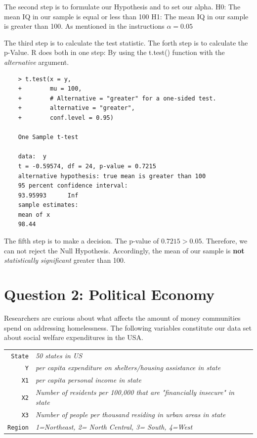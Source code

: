 \documentclass[12pt,letterpaper]{article}
\begin{document}
The second step is to formulate our Hypothesis and to set our alpha.
H0: The mean IQ in our sample is equal or less than 100
H1: The mean IQ in our sample is greater than 100. 
As mentioned in the instructions $\alpha = 0.05$


\newpage

The third step is to calculate the test statistic.
The forth step is to calculate the p-Value. R does both in one step: 
By using the t.test() function with the \textit{alternative} argument. 

\begin{verbatim}
	> t.test(x = y,
	+        mu = 100,
	+        # Alternative = "greater" for a one-sided test.
	+        alternative = "greater",
	+        conf.level = 0.95)
	
	One Sample t-test
	
	data:  y
	t = -0.59574, df = 24, p-value = 0.7215
	alternative hypothesis: true mean is greater than 100
	95 percent confidence interval:
	93.95993      Inf
	sample estimates:
	mean of x 
	98.44 
\end{verbatim}

The fifth step is to make a decision. The p-value of $0.7215 > 0.05$. Therefore, we can not reject the Null Hypothesis. Accordingly, the mean of our sample is \textbf{not} \textit{statistically significant} greater than 100.


	\section*{Question 2: Political Economy}

\noindent Researchers are curious about what affects the amount of money communities spend on addressing homelessness. The following variables constitute our data set about social welfare expenditures in the USA. \\
\vspace{.5cm}


\begin{tabular}{r|l}
	\texttt{State} &\emph{50 states in US} \\
	\texttt{Y} & \emph{per capita expenditure on shelters/housing assistance in state}\\
	\texttt{X1} &\emph{per capita personal income in state} \\
	\texttt{X2} &  \emph{Number of residents per 100,000 that are "financially insecure" in state}\\
	\texttt{X3} &  \emph{Number of people per thousand residing in urban areas in state} \\
	\texttt{Region} &  \emph{1=Northeast, 2= North Central, 3= South, 4=West} \\
\end{tabular}
\end{document}
